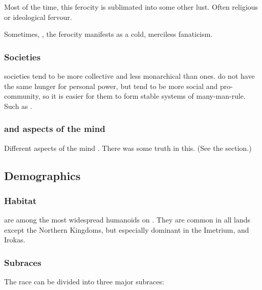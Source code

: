 Most of the time, this ferocity is sublimated into some other lust. 
Often religious or ideological fervour. 

Sometimes, , the ferocity manifests as a cold, merciless fanaticism. 





\subsubsection{Societies}
\Scathaese{} societies tend to be more collective and less monarchical than \human{} ones. 
\Scathae{} do not have the same hunger for personal power, but tend to be more social and pro-community, so it is easier for them to form stable systems of many-man-rule. 
Such as . 





\subsubsection{\XzaiShanns and aspects of the mind}
Different aspects of the \scathaese mind .
There was some truth in this. 
(See the section.)









\subsection{Demographics}
\subsubsection{Habitat}
\Scathae{} are among the most widespread humanoids on \Miith{}. 
They are common in all lands except the Northern Kingdoms, but especially dominant in the Imetrium, \Durcac and Irokas. 





\subsubsection{Subraces}
The \scathaese{} race can be divided into three major subraces: 

